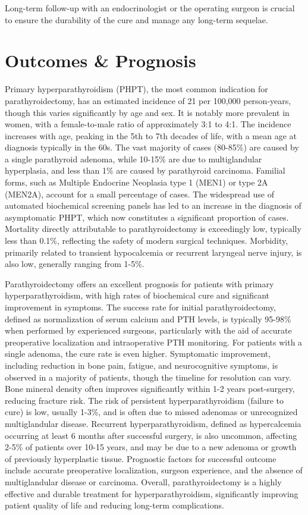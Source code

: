 Long-term follow-up with an endocrinologist or the operating surgeon is crucial to ensure the durability of the cure and manage any long-term sequelae.

\section*{Outcomes \& Prognosis}
Primary hyperparathyroidism (PHPT), the most common indication for parathyroidectomy, has an estimated incidence of 21 per 100,000 person-years, though this varies significantly by age and sex. It is notably more prevalent in women, with a female-to-male ratio of approximately 3:1 to 4:1. The incidence increases with age, peaking in the 5th to 7th decades of life, with a mean age at diagnosis typically in the 60s. The vast majority of cases (80-85\%) are caused by a single parathyroid adenoma, while 10-15\% are due to multiglandular hyperplasia, and less than 1\% are caused by parathyroid carcinoma. Familial forms, such as Multiple Endocrine Neoplasia type 1 (MEN1) or type 2A (MEN2A), account for a small percentage of cases. The widespread use of automated biochemical screening panels has led to an increase in the diagnosis of asymptomatic PHPT, which now constitutes a significant proportion of cases. Mortality directly attributable to parathyroidectomy is exceedingly low, typically less than 0.1\%, reflecting the safety of modern surgical techniques. Morbidity, primarily related to transient hypocalcemia or recurrent laryngeal nerve injury, is also low, generally ranging from 1-5\%.

Parathyroidectomy offers an excellent prognosis for patients with primary hyperparathyroidism, with high rates of biochemical cure and significant improvement in symptoms. The success rate for initial parathyroidectomy, defined as normalization of serum calcium and PTH levels, is typically 95-98\% when performed by experienced surgeons, particularly with the aid of accurate preoperative localization and intraoperative PTH monitoring. For patients with a single adenoma, the cure rate is even higher. Symptomatic improvement, including reduction in bone pain, fatigue, and neurocognitive symptoms, is observed in a majority of patients, though the timeline for resolution can vary. Bone mineral density often improves significantly within 1-2 years post-surgery, reducing fracture risk. The risk of persistent hyperparathyroidism (failure to cure) is low, usually 1-3\%, and is often due to missed adenomas or unrecognized multiglandular disease. Recurrent hyperparathyroidism, defined as hypercalcemia occurring at least 6 months after successful surgery, is also uncommon, affecting 2-5\% of patients over 10-15 years, and may be due to a new adenoma or growth of previously hyperplastic tissue. Prognostic factors for successful outcome include accurate preoperative localization, surgeon experience, and the absence of multiglandular disease or carcinoma. Overall, parathyroidectomy is a highly effective and durable treatment for hyperparathyroidism, significantly improving patient quality of life and reducing long-term complications.

